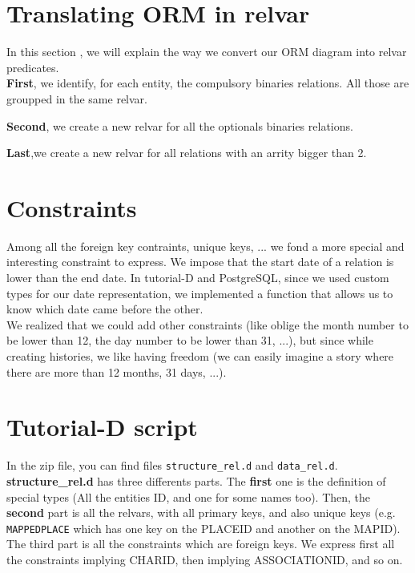 \documentclass[a4paper ,12pt,french]{article}
\begin{document}
\section{Translating ORM in relvar}
In this section , we will explain the way we convert our ORM diagram into relvar predicates.\\

\textbf{First}, we identify, for each entity, the compulsory binaries relations. All those are groupped in the same relvar.

\textbf{Second}, we  create a new relvar for all the optionals binaries relations.

\textbf{Last},we create a new relvar for all relations with an arrity bigger than 2. 

\section{Constraints}

Among all the foreign key contraints, unique keys, ... we fond a more special and interesting constraint to express.
We impose that the start date of a relation is lower than the end date. In tutorial-D and PostgreSQL, since we used custom types for our date representation, we implemented a function that allows us to know which date came before the other.\\

We realized that we could add other constraints (like oblige the month number to be lower than 12, the day number to be lower than 31, ...), but since while creating histories, we like having freedom (we can easily imagine a story where there are more than 12 months, 31 days, ...).


\section{Tutorial-D script}

In the zip file, you can find files \texttt{structure\_rel.d} and \texttt{data\_rel.d}.\\

\textbf{structure\_rel.d} has three differents parts. The \textbf{first} one is the definition of special types (All the entities ID, and one for some names too). Then, the \textbf{second} part is all the relvars, with all primary keys, and also unique keys (e.g. \texttt{MAPPEDPLACE} which has one key on the PLACEID and another on the MAPID). The third part is all the constraints which are foreign keys. We express first all the constraints implying CHARID, then implying ASSOCIATIONID, and so on.\\
\end{document}

